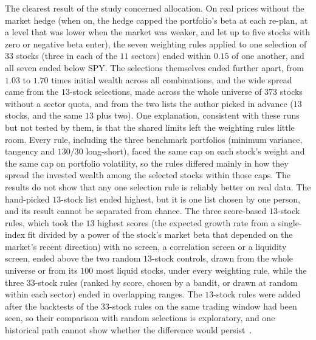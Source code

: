 The clearest result of the study concerned allocation. On real prices without the market hedge (when on, the hedge
capped the portfolio's beta at each re-plan, at a level that was lower when the market was weaker, and let up to five stocks with zero or
negative beta enter), the seven weighting rules applied to one selection of $33$ stocks (three in each of the $11$
sectors) ended within $0.15$ of one another, and all seven ended below SPY. The selections themselves ended further
apart, from $1.03$ to $1.70$ times initial wealth across all combinations, and the wide spread came from the
$13$-stock selections, made across the whole universe of $373$ stocks without a sector quota, and from the two lists the author picked in
advance ($13$ stocks, and the same $13$ plus two). One explanation, consistent with these runs but not tested by them,
is that the shared limits left the weighting rules little room. Every rule, including the three benchmark portfolios (minimum variance, tangency and $130/30$ long-short), faced the
same cap on each stock's weight and the same cap on portfolio volatility, so the rules differed mainly in how they
spread the invested wealth among the selected stocks within those caps. The results do not show that any one
selection rule is reliably better on real data. The hand-picked $13$-stock list ended highest, but it is one list chosen by one
person, and its result cannot be separated from chance. The three score-based $13$-stock rules, which took the $13$
highest scores (the expected growth rate from a single-index fit divided by a power of the stock's market beta that
depended on the market's recent direction) with no screen, a correlation screen or a liquidity screen, ended above
the two random $13$-stock controls, drawn from the whole universe or from its $100$ most liquid stocks, under every
weighting rule, while the three $33$-stock rules (ranked by score, chosen by a
bandit, or drawn at random within each sector) ended in overlapping ranges. The $13$-stock rules were added after the
backtests of the $33$-stock rules on the same trading window had been seen, so their comparison with random
selections is exploratory, and one historical path cannot show whether the difference would
persist~\cite{baileyEtAl2014, harveyLiu2015}.

